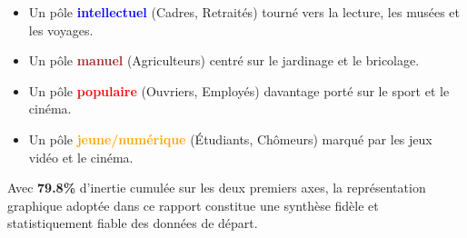 \documentclass[12pt,a4paper]{book}
\begin{document}
	\begin{itemize}
		\item Un pôle \textcolor{blue}{\textbf{intellectuel}} (Cadres, Retraités) tourné vers la lecture, les musées et les voyages.
		\item Un pôle \textcolor{brown}{\textbf{manuel}} (Agriculteurs) centré sur le jardinage et le bricolage.
		\item Un pôle \textcolor{red}{\textbf{populaire}} (Ouvriers, Employés) davantage porté sur le sport et le cinéma.
		\item Un pôle \textcolor{orange}{\textbf{jeune/numérique}} (Étudiants, Chômeurs) marqué par les jeux vidéo et le cinéma.
	\end{itemize}
	
	Avec \textbf{79.8\%} d'inertie cumulée sur les deux premiers axes, la représentation graphique adoptée dans ce rapport constitue une synthèse fidèle et statistiquement fiable des données de départ.
	
\end{document}
